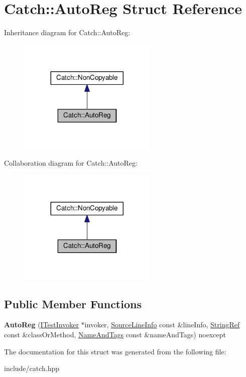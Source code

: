 \hypertarget{structCatch_1_1AutoReg}{}\section{Catch\+:\+:Auto\+Reg Struct Reference}
\label{structCatch_1_1AutoReg}


Inheritance diagram for Catch\+:\+:Auto\+Reg\+:\nopagebreak
\begin{figure}[H]
\begin{center}
\leavevmode
\includegraphics[width=188pt]{structCatch_1_1AutoReg__inherit__graph}
\end{center}
\end{figure}


Collaboration diagram for Catch\+:\+:Auto\+Reg\+:\nopagebreak
\begin{figure}[H]
\begin{center}
\leavevmode
\includegraphics[width=188pt]{structCatch_1_1AutoReg__coll__graph}
\end{center}
\end{figure}
\subsection*{Public Member Functions}
\begin{DoxyCompactItemize}
\item 
{\bfseries Auto\+Reg} (\hyperlink{structCatch_1_1ITestInvoker}{I\+Test\+Invoker} $\ast$invoker, \hyperlink{structCatch_1_1SourceLineInfo}{Source\+Line\+Info} const \&line\+Info, \hyperlink{classCatch_1_1StringRef}{String\+Ref} const \&class\+Or\+Method, \hyperlink{structCatch_1_1NameAndTags}{Name\+And\+Tags} const \&name\+And\+Tags) noexcept\hypertarget{structCatch_1_1AutoReg_a7eba02fb9d80b9896bf5a6517369af28}{}\label{structCatch_1_1AutoReg_a7eba02fb9d80b9896bf5a6517369af28}

\end{DoxyCompactItemize}


The documentation for this struct was generated from the following file\+:\begin{DoxyCompactItemize}
\item 
include/catch.\+hpp\end{DoxyCompactItemize}
